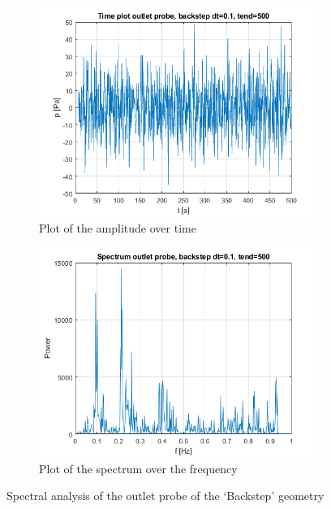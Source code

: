 \documentclass[fleqn,12pt]{NTFD} %
\begin{document}
\begin{figure}[H]
\centering
\begin{subfigure}{.5\textwidth}
  \centering
  \includegraphics[width=.8\linewidth]{backstep_time_outlet.png}
  \caption{Plot of the amplitude over time}
  \label{fig:sub1}
\end{subfigure}%
\begin{subfigure}{.5\textwidth}
  \centering
  \includegraphics[width=.8\linewidth]{backstep_spectrum_outlet.png}
  \caption{Plot of the spectrum over the frequency}
  \label{fig:sub2}
\end{subfigure}
\caption{Spectral analysis of the outlet probe of the `Backstep' geometry}
\label{fig:spectral backstep outlet}
\end{figure}
\end{document}
